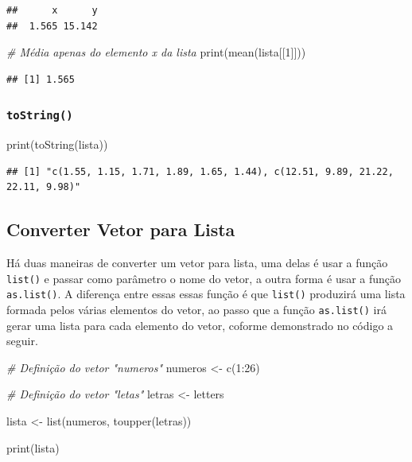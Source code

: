 \documentclass[
]{article}
\newenvironment{Shaded}{\begin{snugshade}}{\end{snugshade}}
\newcommand{\CommentTok}[1]{\textcolor[rgb]{0.56,0.35,0.01}{\textit{#1}}}
\newcommand{\DecValTok}[1]{\textcolor[rgb]{0.00,0.00,0.81}{#1}}
\newcommand{\FunctionTok}[1]{\textcolor[rgb]{0.00,0.00,0.00}{#1}}
\newcommand{\NormalTok}[1]{#1}
\newcommand{\OtherTok}[1]{\textcolor[rgb]{0.56,0.35,0.01}{#1}}
\newcommand{\SpecialCharTok}[1]{\textcolor[rgb]{0.00,0.00,0.00}{#1}}
\begin{document}
\begin{verbatim}
##      x      y 
##  1.565 15.142
\end{verbatim}

\begin{Shaded}
\begin{Highlighting}[]
\CommentTok{\# Média apenas do elemento x da lista}
\FunctionTok{print}\NormalTok{(}\FunctionTok{mean}\NormalTok{(lista[[}\DecValTok{1}\NormalTok{]]))}
\end{Highlighting}
\end{Shaded}

\begin{verbatim}
## [1] 1.565
\end{verbatim}

\hypertarget{tostring}{%
\subsubsection{\texorpdfstring{\textbf{\texttt{toString()}}}{toString()}}\label{tostring}}

\begin{Shaded}
\begin{Highlighting}[]
\FunctionTok{print}\NormalTok{(}\FunctionTok{toString}\NormalTok{(lista))}
\end{Highlighting}
\end{Shaded}

\begin{verbatim}
## [1] "c(1.55, 1.15, 1.71, 1.89, 1.65, 1.44), c(12.51, 9.89, 21.22, 22.11, 9.98)"
\end{verbatim}

\hypertarget{converter-vetor-para-lista}{%
\subsection{Converter Vetor para
Lista}\label{converter-vetor-para-lista}}

Há duas maneiras de converter um vetor para lista, uma delas é usar a
função \texttt{list()} e passar como parâmetro o nome do vetor, a outra
forma é usar a função \texttt{as.list()}. A diferença entre essas essas
função é que \texttt{list()} produzirá uma lista formada pelos várias
elementos do vetor, ao passo que a função \texttt{as.list()} irá gerar
uma lista para cada elemento do vetor, coforme demonstrado no código a
seguir.

\begin{Shaded}
\begin{Highlighting}[]
\CommentTok{\# Definição do vetor "numeros"}
\NormalTok{numeros }\OtherTok{\textless{}{-}} \FunctionTok{c}\NormalTok{(}\DecValTok{1}\SpecialCharTok{:}\DecValTok{26}\NormalTok{)}

\CommentTok{\# Definição do vetor "letas"}
\NormalTok{letras }\OtherTok{\textless{}{-}}\NormalTok{ letters}

\NormalTok{lista }\OtherTok{\textless{}{-}} \FunctionTok{list}\NormalTok{(numeros, }\FunctionTok{toupper}\NormalTok{(letras))}

\FunctionTok{print}\NormalTok{(lista)}
\end{Highlighting}
\end{Shaded}
\end{document}
